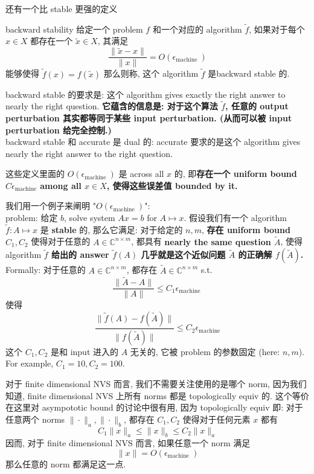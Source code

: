 还有一个比 stable 更强的定义
\begin{definition}{backward stability}
    给定一个 problem $f$ 和一个对应的 algorithm $\tilde{f}$, 如果对于每个 $x \in X$ 都存在一个 $\tilde{x} \in X$, 其满足$$
\frac{\|\tilde{x}-x\|}{\|x\|}=O\left(\epsilon_{\text {machine }}\right)
$$能够使得 $\tilde{f}(x)= f(\tilde{x})$ 那么则称, 这个 algorithm $\tilde{f}$ 是backward stable 的.
\end{definition}
backward stable 的要求是: 这个 algorithm gives exactly the right answer to nearly the right question. \textbf{它蕴含的信息是: 对于这个算法 $\tilde{f}$, 任意的 output perturbation 其实都等同于某些 input perturbation. (从而可以被 input perturbation 给完全控制.)}\\
backward stable 和 accurate 是 dual 的: accurate 要求的是这个 algorithm gives nearly the right answer to the right question.\\
\begin{remark}
这些定义里面的 $O\left(\epsilon_{\text {machine }}\right)$ 是 across all $x$ 的, 即\textbf{存在一个 uniform bound $C\epsilon_{\text{machine}}$ among all $x\in X$, 使得这些误差值 bounded by it.}
\begin{example}
我们用一个例子来阐明 "$O\left(\epsilon_{\text {machine }}\right)$":\\
problem: 给定 $b$, solve system $Ax = b$ for $A \mapsto x$. 假设我们有一个 algorithm $\tilde{f}: A \mapsto x$ 是 \textbf{stable} 的, 那么它满足: 对于给定的 $n,m$, \textbf{存在 uniform bound $C_1,C_2$} 使得对于任意的 $A \in \mathbb{C}^{n\times m}$, 都具有 \textbf{nearly the same question $\tilde{A}$},  使得 algorithm \textbf{$\tilde{f}$ 给出的 answer $\tilde{f}(A)$ 几乎就是这个近似问题 $\tilde{A}$ 的正确解 $f(\tilde{A})$.}\\
Formally: 对于任意的 $A \in \mathbb{C}^{n\times m}$, 都存在  $\tilde{A} \in \mathbb{C}^{n\times m}$ s.t. \[
\frac{\|\tilde{A}-A\|}{\|A\|}\leq C_1 \epsilon_{\text {machine }}
\]使得 \[
\frac{\| \tilde{f}(A) - f(\tilde{A})\| }{\| f(\tilde{A}) \|}  \leq C_2 \epsilon_{\text{machine}}
\]
这个 $C_1,C_2$ 是和 input 进入的 $A$ 无关的, 它被 problem 的参数固定 (here: $n,m$). For example, $C_1 = 10,C_2 = 100$.
\end{example}
\end{remark}
\begin{remark}
    对于 finite dimensional NVS 而言, 我们不需要关注使用的是哪个 norm, 因为我们知道,  finite dimensional NVS 上所有 norms 都是 topologically equiv 的. 这个等价在这里对 asympototic bound 的讨论中很有用, 因为  topologically equiv 即: 对于任意两个 norms $\|\cdot\|_a,\|\cdot\|_b $, 都存在 $C_1, C_2$ 使得对于任何元素 $x$ 都有 \[
C_1   \| x\|_a \leq   \| x\|_b \leq C_2  \| x\|_a
    \]
    因而,   对于 finite dimensional NVS 而言, 如果任意一个 norm 满足$$
\| x\|=O\left(\epsilon_{\text {machine }}\right)
$$那么任意的 norm 都满足这一点.
\end{remark}


